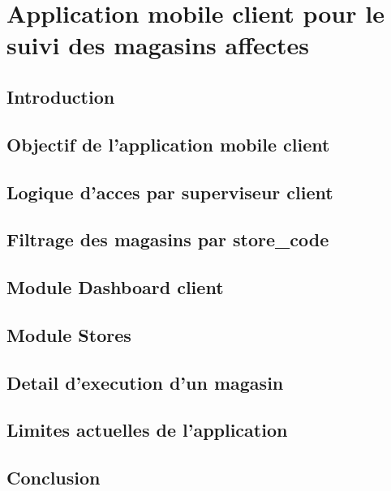 \chapter{Application mobile client pour le suivi des magasins affectes}

\section{Introduction}

\section{Objectif de l'application mobile client}

\section{Logique d'acces par superviseur client}

\section{Filtrage des magasins par store\_code}

\section{Module Dashboard client}

\section{Module Stores}

\section{Detail d'execution d'un magasin}

\section{Limites actuelles de l'application}

\section{Conclusion}

